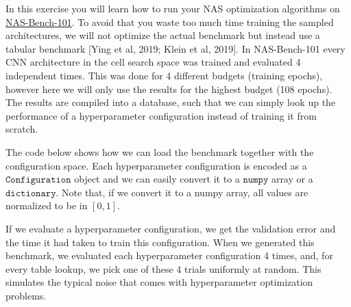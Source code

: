 \documentclass{exam}
\begin{document}
        \gccs
	In this exercise you will learn how to run your NAS optimization algorithms on \href{https://github.com/google-research/nasbench}{NAS-Bench-101}. To avoid that you waste too much time training the sampled architectures, we will not optimize the actual benchmark but instead use a tabular benchmark [Ying et al, 2019; Klein et al, 2019]. In NAS-Bench-101 every CNN architecture in the cell search space was trained and evaluated 4 independent times. This was done for 4 different budgets (training epochs), however here we will only use the results for the highest budget (108 epochs).
The results are compiled into a database, such that we can simply look up the performance of a hyperparameter configuration instead of training it from scratch.

The code below shows how we can load the benchmark together with the configuration space.
Each hyperparameter configuration is encoded as a $\texttt{Configuration}$ object and we can easily convert it to a $\texttt{numpy}$ array or a $\texttt{dictionary}$. Note that, if we convert it to a numpy array, all values are normalized to be in $[0, 1]$.

If we evaluate a hyperparameter configuration, we get the validation error and the time it had taken to train this configuration. When we generated this benchmark, we evaluated each hyperparameter configuration 4 times, and, for every table lookup, we pick one of these 4 trials uniformly at random. This simulates the typical noise that comes with hyperparameter optimization problems.
\end{document}
